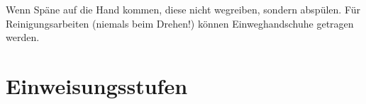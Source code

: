 \documentclass{\basedir/fablab-document}
\begin{document}
Wenn Späne auf die Hand kommen, diese nicht wegreiben, sondern abspülen. Für Reinigungsarbeiten (niemals beim Drehen!) können Einweghandschuhe getragen werden.



\newpage
\listoftodos \newpage %

\renewcommand{\contentsname}{Inhaltsverzeichnis / Arbeitsablauf}
\setcounter{tocdepth}{2}
{\small\tableofcontents} %

\newpage



\section{Einweisungsstufen}

\end{document}
